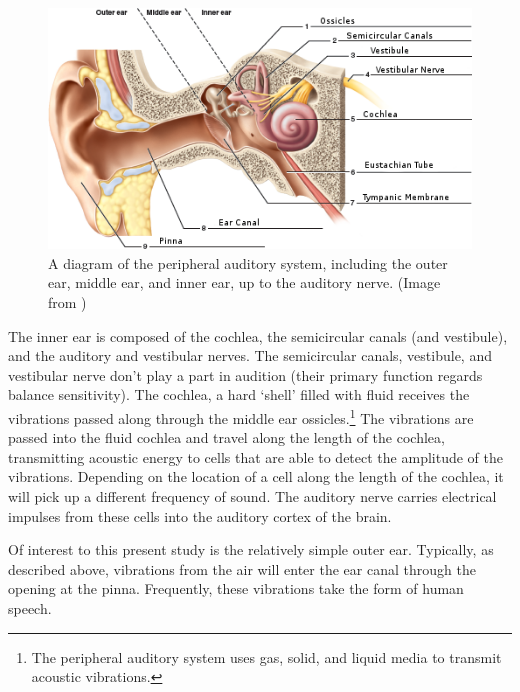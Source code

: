 \begin{figure}[h]
\centering
  \includegraphics{figure/ear_anatomy.png}
  \caption{A diagram of the peripheral auditory system, including the outer ear, middle ear, and inner ear, up to the auditory nerve. (Image from \cite{martin:12})}
  \label{fig:ear-anatomy}
\end{figure}

The inner ear is composed of the cochlea, the semicircular canals (and vestibule), and the auditory and vestibular nerves.  The semicircular canals, vestibule, and vestibular nerve don't play a part in audition (their primary function regards balance sensitivity).  The cochlea, a hard `shell' filled with fluid receives the vibrations passed along through the middle ear ossicles.\footnote{The peripheral auditory system uses gas, solid, and liquid media to transmit acoustic vibrations.}  The vibrations are passed into the fluid cochlea and travel along the length of the cochlea, transmitting acoustic energy to cells that are able to detect the amplitude of the vibrations.  Depending on the location of a cell along the length of the cochlea, it will pick up a different frequency of sound.  The auditory nerve carries electrical impulses from these cells into the auditory cortex of the brain. 

Of interest to this present study is the relatively simple outer ear.  Typically, as described above, vibrations from the air will enter the ear canal through the opening at the pinna. Frequently, these vibrations take the form of human speech.



